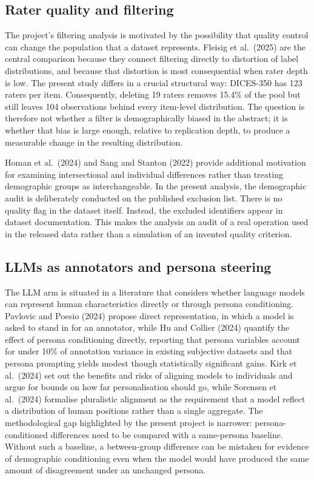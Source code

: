 \documentclass[11pt,a4paper]{article}
\begin{document}
\subsection{Rater quality and filtering}

The project's filtering analysis is motivated by the possibility that quality control can change
the population that a dataset represents. Fleisig et al.\ (2025) are the central comparison
because they connect filtering directly to distortion of label distributions, and because that
distortion is most consequential when rater depth is low. The present study differs in a crucial structural way: DICES-350 has
123 raters per item. Consequently, deleting 19 raters removes 15.4\% of the pool but still leaves
104 observations behind every item-level distribution. The question is therefore not whether a
filter is demographically biased in the abstract; it is whether that bias is large enough,
relative to replication depth, to produce a measurable change in the resulting distribution.

Homan et al.\ (2024) and Sang and Stanton (2022) provide additional motivation for examining
intersectional and individual differences rather than treating demographic groups as
interchangeable. In the present analysis, the demographic audit is deliberately conducted on the
published exclusion list. There is no quality flag in the dataset itself. Instead, the excluded
identifiers appear in dataset documentation. This makes the analysis an audit of a real operation
used in the released data rather than a simulation of an invented quality criterion.

\subsection{LLMs as annotators and persona steering}

The LLM arm is situated in a literature that considers whether language models can represent
human characteristics directly or through persona conditioning. Pavlovic and Poesio (2024)
propose direct representation, in which a model is asked to stand in for an annotator, while
Hu and Collier (2024) quantify the effect of persona conditioning directly, reporting that
persona variables account for under 10\% of annotation variance in existing subjective datasets
and that persona prompting yields modest though statistically significant gains. Kirk et al.\ (2024) set out the benefits and
risks of aligning models to individuals and argue for bounds on how far personalisation should
go, while Sorensen et al.\ (2024) formalise pluralistic alignment as the requirement that a
model reflect a distribution of human positions rather than a single aggregate. The methodological gap highlighted by the
present project is narrower: persona-conditioned differences need to be compared with a
same-persona baseline. Without such a baseline, a between-group difference can be mistaken for
evidence of demographic conditioning even when the model would have produced the same amount of
disagreement under an unchanged persona.
\end{document}
